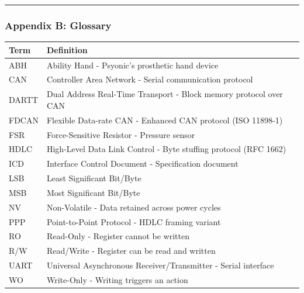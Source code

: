 \documentclass[
  11pt,
]{article}
\newcounter{none} %
\begin{document}
\begin{center}\rule{0.5\linewidth}{0.5pt}\end{center}

\subsubsection{Appendix B: Glossary}\label{appendix-b-glossary}

{\def\LTcaptype{none} %
\begin{longtable}[]{@{}
  >{\raggedright\arraybackslash}p{}
  >{\raggedright\arraybackslash}p{}@{}}
\toprule\noalign{}
\begin{minipage}[b]{\linewidth}\raggedright
Term
\end{minipage} & \begin{minipage}[b]{\linewidth}\raggedright
Definition
\end{minipage} \\
\midrule\noalign{}
\endhead
\bottomrule\noalign{}
\endlastfoot
ABH & Ability Hand - Psyonic's prosthetic hand device \\
CAN & Controller Area Network - Serial communication protocol \\
DARTT & Dual Address Real-Time Transport - Block memory protocol over
CAN \\
FDCAN & Flexible Data-rate CAN - Enhanced CAN protocol (ISO 11898-1) \\
FSR & Force-Sensitive Resistor - Pressure sensor \\
HDLC & High-Level Data Link Control - Byte stuffing protocol (RFC
1662) \\
ICD & Interface Control Document - Specification document \\
LSB & Least Significant Bit/Byte \\
MSB & Most Significant Bit/Byte \\
NV & Non-Volatile - Data retained across power cycles \\
PPP & Point-to-Point Protocol - HDLC framing variant \\
RO & Read-Only - Register cannot be written \\
R/W & Read/Write - Register can be read and written \\
UART & Universal Asynchronous Receiver/Transmitter - Serial interface \\
WO & Write-Only - Writing triggers an action \\
\end{longtable}
}
\end{document}
